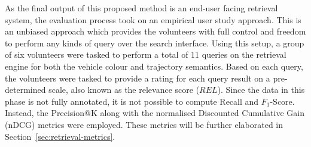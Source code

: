 As the final output of this proposed method is an end-user facing retrieval system, the evaluation process took on an empirical user study approach. This is an unbiased approach which provides the volunteers with full control and freedom to perform any kinds of query over the search interface.
Using this setup, a group of six volunteers were tasked to perform a total of 11 queries on the retrieval engine for both the vehicle colour and trajectory semantics.
Based on each query, the volunteers were tasked to provide a rating for each query result on a pre-determined scale, also known as the relevance score ($REL$).
Since the data in this phase is not fully annotated, it is not possible to compute Recall and $F_1$-Score. Instead, the Precision@K along with the normalised Discounted Cumulative Gain (nDCG) metrics were employed. These metrics will be further elaborated in Section~\ref{sec:retrieval-metrics}.

